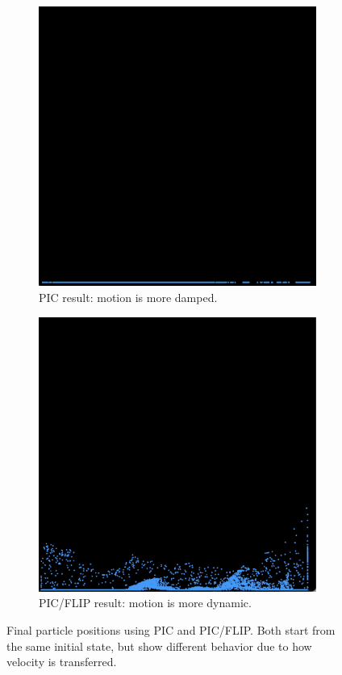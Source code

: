 \begin{figure}[h]
    \centering
    \begin{subfigure}[b]{0.4\textwidth}
        \includegraphics[width=\textwidth]{figures/pic_result.png}
        \caption{PIC result: motion is more damped.}
    \end{subfigure}
    \hspace{0.05\textwidth}
    \begin{subfigure}[b]{0.4\textwidth}
        \includegraphics[width=\textwidth]{figures/pic_flip_result.png}
        \caption{PIC/FLIP result: motion is more dynamic.}
    \end{subfigure}
    \caption{Final particle positions using PIC and PIC/FLIP. Both start from the same initial state, but show different behavior due to how velocity is transferred.}
    \label{fig:pic_comparison}
\end{figure}


